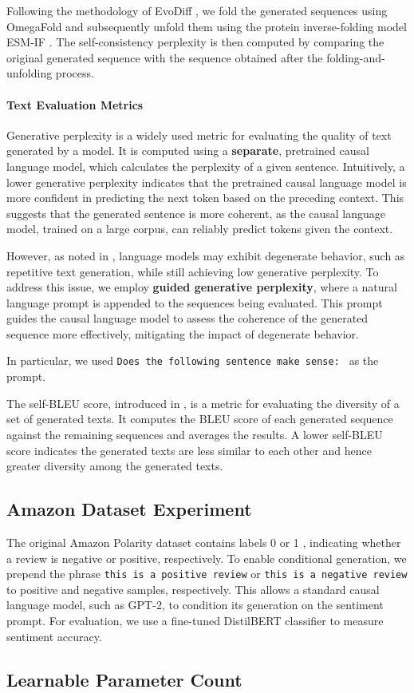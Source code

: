 Following the methodology of EvoDiff \citep{Alamdari2023.09.11.556673}, we fold the generated sequences using OmegaFold and subsequently unfold them using the protein inverse-folding model ESM-IF \citep{hsu2022learning}. The self-consistency perplexity is then computed by comparing the original generated sequence with the sequence obtained after the folding-and-unfolding process.

\paragraph{Text Evaluation Metrics}
Generative perplexity is a widely used metric for evaluating the quality of text generated by a model. It is computed using a \textbf{separate}, pretrained causal language model, which calculates the perplexity of a given sentence. Intuitively, a lower generative perplexity indicates that the pretrained causal language model is more confident in predicting the next token based on the preceding context. This suggests that the generated sentence is more coherent, as the causal language model, trained on a large corpus, can reliably predict tokens given the context.

However, as noted in \cite{holtzman2020curiouscaseneuraltext}, language models may exhibit degenerate behavior, such as repetitive text generation, while still achieving low generative perplexity. To address this issue, we employ \textbf{guided generative perplexity}, where a natural language prompt is appended to the sequences being evaluated. This prompt guides the causal language model to assess the coherence of the generated sequence more effectively, mitigating the impact of degenerate behavior.

In particular, we used \texttt{Does the following sentence make sense: } as the prompt.

The self-BLEU score, introduced in \citep{zhu2018texygenbenchmarkingplatformtext}, is a metric for evaluating the diversity of a set of generated texts. It computes the BLEU score of each generated sequence against the remaining sequences and averages the results. A lower self-BLEU score indicates the generated texts are less similar to each other and hence greater diversity among the generated texts.

\subsection{Amazon Dataset Experiment}\label{sec:amazon_process}
The original Amazon Polarity dataset contains labels 0 or 1 , indicating whether a review is negative or positive, respectively. To enable conditional generation, we prepend the phrase \texttt{this is a positive review} or \texttt{this is a negative review} to positive and negative samples, respectively. This allows a standard causal language model, such as GPT-2, to condition its generation on the sentiment prompt. For evaluation, we use a fine-tuned DistilBERT classifier to measure sentiment accuracy. 


\subsection{Learnable Parameter Count}


